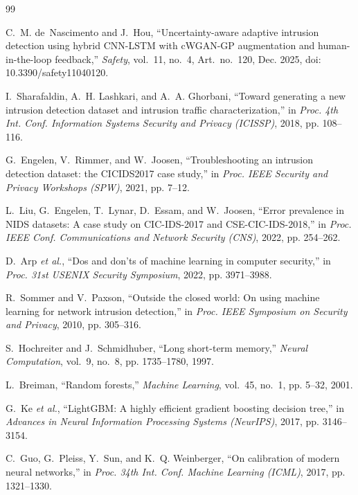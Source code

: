 \documentclass[conference]{IEEEtran}
\begin{document}
\begin{thebibliography}{99}

C.~M. de~Nascimento and J.~Hou, ``Uncertainty-aware adaptive intrusion detection using hybrid CNN-LSTM with cWGAN-GP augmentation and human-in-the-loop feedback,'' \textit{Safety}, vol.~11, no.~4, Art.~no.~120, Dec. 2025, doi: 10.3390/safety11040120.

I.~Sharafaldin, A.~H. Lashkari, and A.~A. Ghorbani, ``Toward generating a new intrusion detection dataset and intrusion traffic characterization,'' in \textit{Proc. 4th Int. Conf. Information Systems Security and Privacy (ICISSP)}, 2018, pp. 108--116.

G.~Engelen, V.~Rimmer, and W.~Joosen, ``Troubleshooting an intrusion detection dataset: the CICIDS2017 case study,'' in \textit{Proc. IEEE Security and Privacy Workshops (SPW)}, 2021, pp. 7--12.

L.~Liu, G.~Engelen, T.~Lynar, D.~Essam, and W.~Joosen, ``Error prevalence in NIDS datasets: A case study on CIC-IDS-2017 and CSE-CIC-IDS-2018,'' in \textit{Proc. IEEE Conf. Communications and Network Security (CNS)}, 2022, pp. 254--262.

D.~Arp \textit{et al.}, ``Dos and don'ts of machine learning in computer security,'' in \textit{Proc. 31st USENIX Security Symposium}, 2022, pp. 3971--3988.

R.~Sommer and V.~Paxson, ``Outside the closed world: On using machine learning for network intrusion detection,'' in \textit{Proc. IEEE Symposium on Security and Privacy}, 2010, pp. 305--316.

S.~Hochreiter and J.~Schmidhuber, ``Long short-term memory,'' \textit{Neural Computation}, vol.~9, no.~8, pp. 1735--1780, 1997.

L.~Breiman, ``Random forests,'' \textit{Machine Learning}, vol.~45, no.~1, pp. 5--32, 2001.

G.~Ke \textit{et al.}, ``LightGBM: A highly efficient gradient boosting decision tree,'' in \textit{Advances in Neural Information Processing Systems (NeurIPS)}, 2017, pp. 3146--3154.

C.~Guo, G.~Pleiss, Y.~Sun, and K.~Q. Weinberger, ``On calibration of modern neural networks,'' in \textit{Proc. 34th Int. Conf. Machine Learning (ICML)}, 2017, pp. 1321--1330.


\end{thebibliography}
\end{document}
